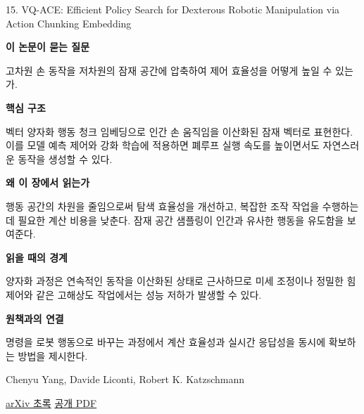 \documentclass[11pt,openany]{book}
\begin{document}
\begin{termcard}{15. VQ-ACE: Efficient Policy Search for Dexterous Robotic Manipulation via Action Chunking Embedding}

\par

\medskip

{\sffamily\bfseries\color{deepblue} 이 논문이 묻는 질문}\par

고차원 손 동작을 저차원의 잠재 공간에 압축하여 제어 효율성을 어떻게 높일 수 있는가.

\smallskip

{\sffamily\bfseries\color{deepblue} 핵심 구조}\par

벡터 양자화 행동 청크 임베딩으로 인간 손 움직임을 이산화된 잠재 벡터로 표현한다. 이를 모델 예측 제어와 강화 학습에 적용하면 폐루프 실행 속도를 높이면서도 자연스러운 동작을 생성할 수 있다.

\smallskip

{\sffamily\bfseries\color{deepblue} 왜 이 장에서 읽는가}\par

행동 공간의 차원을 줄임으로써 탐색 효율성을 개선하고, 복잡한 조작 작업을 수행하는 데 필요한 계산 비용을 낮춘다. 잠재 공간 샘플링이 인간과 유사한 행동을 유도함을 보여준다.

\smallskip

{\sffamily\bfseries\color{coral} 읽을 때의 경계}\par

양자화 과정은 연속적인 동작을 이산화된 상태로 근사하므로 미세 조정이나 정밀한 힘 제어와 같은 고해상도 작업에서는 성능 저하가 발생할 수 있다.

\smallskip

{\sffamily\bfseries\color{teal} 원책과의 연결}\par

명령을 로봇 행동으로 바꾸는 과정에서 계산 효율성과 실시간 응답성을 동시에 확보하는 방법을 제시한다.

\medskip

{\footnotesize\color{muted} Chenyu Yang, Davide Liconti, Robert K. Katzschmann\par

\href{https://arxiv.org/abs/2411.03556}{arXiv 초록} \quad \href{https://arxiv.org/pdf/2411.03556}{공개 PDF}\par}

\end{termcard}
\end{document}
